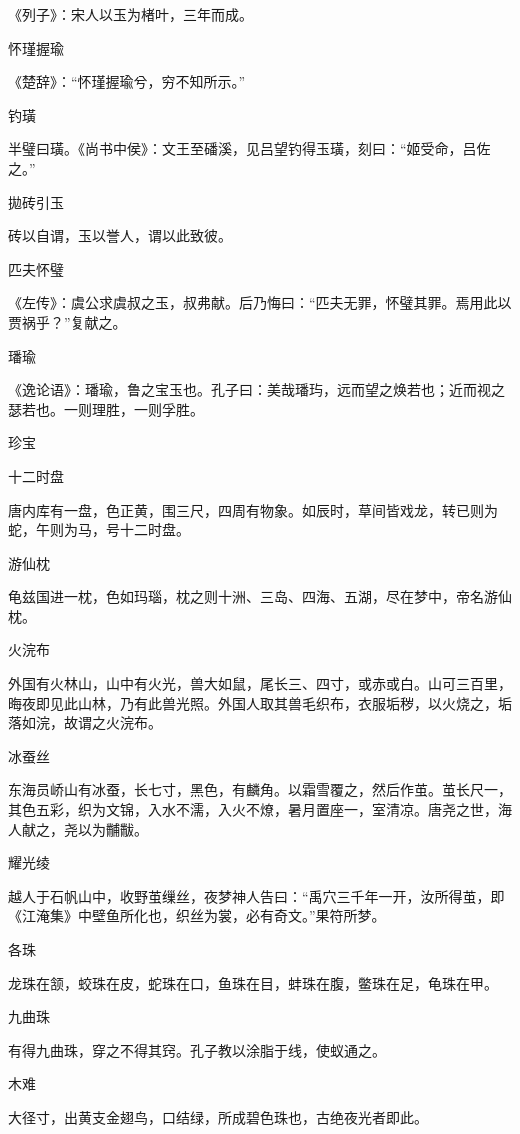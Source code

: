 \documentclass[a4paper,12pt,UTF8,twoside]{ctexbook}
\begin{document}
    《列子》：宋人以玉为楮叶，三年而成。
    
    怀瑾握瑜
    
    《楚辞》：“怀瑾握瑜兮，穷不知所示。”
    
    钓璜
    
    半璧曰璜。《尚书中侯》：文王至磻溪，见吕望钓得玉璜，刻曰：“姬受命，吕佐之。”
    
    拋砖引玉
    
    砖以自谓，玉以誉人，谓以此致彼。
    
    匹夫怀璧
    
    《左传》：虞公求虞叔之玉，叔弗献。后乃悔曰：“匹夫无罪，怀璧其罪。焉用此以贾祸乎？”复献之。
    
    璠瑜
    
    《逸论语》：璠瑜，鲁之宝玉也。孔子曰：美哉璠玙，远而望之焕若也；近而视之瑟若也。一则理胜，一则孚胜。
    
    珍宝
    
    十二时盘
    
    唐内库有一盘，色正黄，围三尺，四周有物象。如辰时，草间皆戏龙，转已则为蛇，午则为马，号十二时盘。
    
    游仙枕
    
    龟兹国进一枕，色如玛瑙，枕之则十洲、三岛、四海、五湖，尽在梦中，帝名游仙枕。
    
    火浣布
    
    外国有火林山，山中有火光，兽大如鼠，尾长三、四寸，或赤或白。山可三百里，晦夜即见此山林，乃有此兽光照。外国人取其兽毛织布，衣服垢秽，以火烧之，垢落如浣，故谓之火浣布。
    
    冰蚕丝
    
    东海员峤山有冰蚕，长七寸，黑色，有麟角。以霜雪覆之，然后作茧。茧长尺一，其色五彩，织为文锦，入水不濡，入火不燎，暑月置座一，室清凉。唐尧之世，海人献之，尧以为黼黻。
    
    耀光绫
    
    越人于石帆山中，收野茧缫丝，夜梦神人告曰：“禹穴三千年一开，汝所得茧，即《江淹集》中壁鱼所化也，织丝为裳，必有奇文。”果符所梦。
    
    各珠
    
    龙珠在颔，蛟珠在皮，蛇珠在口，鱼珠在目，蚌珠在腹，鳖珠在足，龟珠在甲。
    
    九曲珠
    
    有得九曲珠，穿之不得其窍。孔子教以涂脂于线，使蚁通之。
    
    木难
    
    大径寸，出黄支金翅鸟，口结绿，所成碧色珠也，古绝夜光者即此。
    
\end{document}

